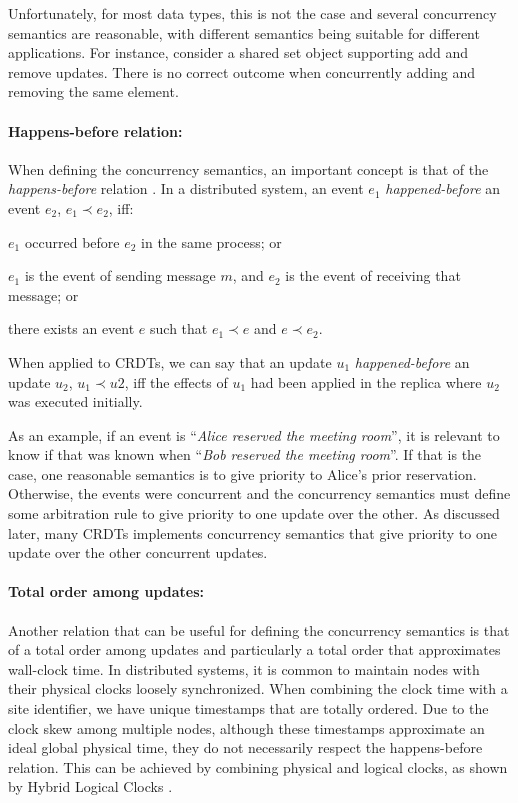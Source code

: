 \documentclass[12pt]{article}
\begin{document}
Unfortunately, for most data types, this is not the case and several 
concurrency semantics are reasonable, with different semantics being 
suitable for different applications.
For instance, consider a shared set object supporting add and
remove updates. 
There is no correct outcome when concurrently adding and removing the same
element.


\paragraph{Happens-before relation:}
When defining the concurrency semantics, an important concept 
is that of the \emph{happens-before} relation \cite{Lamport78Time}. 
In a distributed system, an event $e_1$ \emph{happened-before} an event $e_2$, 
$e_1 \prec e_2$, iff:
\begin{inparaenum}[(i)]
\item $e_1$ occurred before $e_2$ in the same process; or 
\item $e_1$ is the event of sending message $m$, and $e_2$ is the event
of receiving that message; or
\item there exists an event $e$ such that $e_1 \prec e$ and $e \prec e_2$. 
\end{inparaenum}
When applied to CRDTs, we can say that an
update $u_1$ \emph{happened-before} an update $u_2$, $u_1 \prec u2$, iff the 
effects of $u_1$ had been applied in the replica where $u_2$ was executed 
initially.

As an example, if an event is ``\emph{Alice reserved the meeting room}'', it 
is relevant to know if that was known when ``\emph{Bob reserved the meeting room}''.
If that is the case, one reasonable semantics is to give priority to Alice's prior reservation.
Otherwise, the events were concurrent and the concurrency semantics must define 
some arbitration rule to give priority to one update over the other.
As discussed later, many CRDTs implements concurrency semantics that give priority 
to one update over the other concurrent updates.

\paragraph{Total order among updates:}
Another relation that can be useful for defining the concurrency semantics is 
that of a total order among updates and particularly a total order that 
approximates wall-clock time. 
In distributed systems, it is common to maintain nodes with their physical clocks 
loosely synchronized. 
When combining the clock time with a site identifier, we have unique 
timestamps that are totally ordered.
Due to the clock skew among multiple nodes, although these timestamps
approximate an ideal global physical time, they do not necessarily respect the happens-before
relation.
This can be achieved by combining physical and logical clocks, as
shown by Hybrid Logical Clocks \cite{DBLP:conf/opodis/KulkarniDMAL14}.
\end{document}
